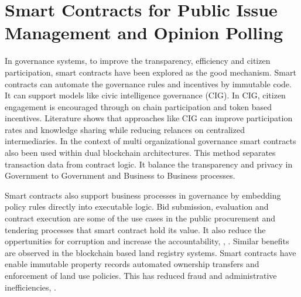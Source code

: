 \section{Smart Contracts for Public Issue Management and Opinion Polling}

In governance systems, to improve the transparency, efficiency and citizen participation, smart contracts have been explored as the good mechanism. Smart contracts can automate the governance rules and incentives by immutable code. It can support models like civic intelligence governance (CIG). In CIG, citizen engagement is encouraged through on chain participation and token based incentives\cite{MDPI_2023_CivicIntelligence}. Literature shows that approaches like CIG can improve participation rates and knowledge sharing while reducing relances on centralized intermediaries. In the context of multi organizational governance smart contracts also been used within dual blockchain architectures. This method separates transaction data from contract logic. It balance the transparency and privacy in Government to Government and Business to Business processes\cite{IEEE_2021_SmartCon}.


Smart contracts also support business processes in governance by embedding policy rules directly into executable logic. Bid submission, evaluation and contract execution are some of the use cases in the public procurement and tendering processes that smart contract hold its value. It also reduce the oppertunities for corruption and increase the accountability\cite{IEEE_2021_SmartCon}, \cite{GovernanceNow_2023_SmartContractsToolkit}, \cite{AICERTs_2023_FutureOfGovernance}. Similar benefits are observed in the blockchain based land registry systems. Smart contracts have enable immutable property records automated ownership transfers and enforcement of land use policies. This has reduced fraud and administrative inefficiencies\cite{ResearchGate_2020_LandRegistry}, \cite{MDPI_2023_NamibianLandRegistration}.

